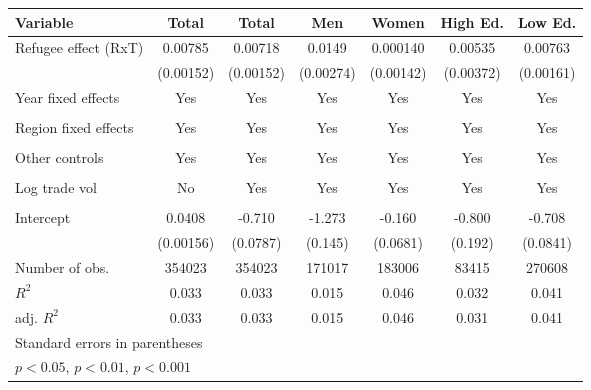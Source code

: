 \documentclass{article}
\begin{document}
{\begin{tabular}{l*{6}{c}}
\hline
Variable           
            &\multicolumn{1}{c}{Total}&\multicolumn{1}{c}{Total}&\multicolumn{1}{c}{Men}&\multicolumn{1}{c}{Women}&\multicolumn{1}{c}{High Ed.}&\multicolumn{1}{c}{Low Ed.}\\
\hline
Refugee effect (RxT)         &     0.00785\sym{***}&     0.00718\sym{***}&      0.0149\sym{***}&    0.000140         &     0.00535         &     0.00763\sym{***}\\
            &   (0.00152)         &   (0.00152)         &   (0.00274)         &   (0.00142)         &   (0.00372)         &   (0.00161)         \\
[1em]
Year fixed  effects         &      Yes&      Yes&                Yes &                     Yes&     Yes&      Yes\\
            &           &           &                     &                     &            &          \\
[1em]
Region fixed effects     &     Yes&     Yes&     Yes&     Yes&     Yes&   Yes\\
            &            &            &            &          &           &            \\
[1em]
Other controls       &      Yes&      Yes&      Yes&     Yes&     Yes&      Yes\\
            &           &           &           &           &          &           \\
[1em]
Log trade vol   &                     No&     Yes&     Yes&     Yes &      Yes&      Yes\\
            &                     &          &           &            &           &           \\
[1em]
Intercept      &      0.0408\sym{***}&      -0.710\sym{***}&      -1.273\sym{***}&      -0.160\sym{*}  &      -0.800\sym{***}&      -0.708\sym{***}\\
            &   (0.00156)         &    (0.0787)         &     (0.145)         &    (0.0681)         &     (0.192)         &    (0.0841)         \\
\hline
Number of obs.      &      354023         &      354023         &      171017         &      183006         &       83415         &      270608         \\
\(R^{2}\)   &       0.033         &       0.033         &       0.015         &       0.046         &       0.032         &       0.041         \\
adj. \(R^{2}\)&       0.033         &       0.033         &       0.015         &       0.046         &       0.031         &       0.041         \\
\hline\hline
\multicolumn{7}{l}{\footnotesize Standard errors in parentheses}\\
\multicolumn{7}{l}{\footnotesize \sym{*} \(p<0.05\), \sym{**} \(p<0.01\), \sym{***} \(p<0.001\)}\\
\end{tabular}
}
\end{document}
